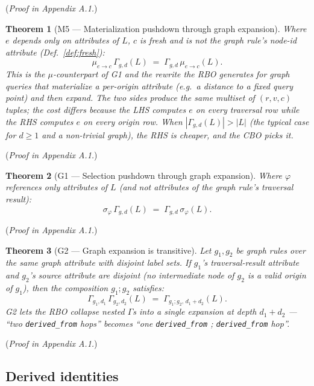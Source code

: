 \documentclass[acmsmall,review,anonymous]{acmart}
\theoremstyle{plain}
\newtheorem{theorem}{Theorem}
\theoremstyle{definition}
\theoremstyle{remark}
\begin{document}
(\textit{Proof in Appendix A.1.})

\begin{theorem}[M5 --- Materialization pushdown through graph expansion]\label{thm:m5}
Where $e$ depends only on attributes of $L$, $c$ is fresh and is
not the graph rule's node-id attribute (Def.~\ref{def:fresh}):
\[
\mu_{e \to c}\, \Gamma_{g, d}(L)
\;=\;
\Gamma_{g, d}\, \mu_{e \to c}(L).
\]
This is the $\mu$-counterpart of G1 and the rewrite the RBO
generates for graph queries that materialize a per-origin
attribute (e.g.\ a distance to a fixed query point) and then
expand. The two sides produce the same multiset of
$(r, v, c)$ tuples; the cost differs because the LHS computes
$e$ on every traversal row while the RHS computes $e$ on every
origin row. When $|\Gamma_{g,d}(L)| > |L|$ (the typical case for
$d \geq 1$ and a non-trivial graph), the RHS is cheaper, and
the CBO picks it.
\end{theorem}

(\textit{Proof in Appendix A.1.})

\begin{theorem}[G1 --- Selection pushdown through graph expansion]\label{thm:g1}
Where $\varphi$ references only attributes of $L$ (and not
attributes of the graph rule's traversal result):
\[
\sigma_\varphi\, \Gamma_{g, d}(L) \;=\; \Gamma_{g, d}\, \sigma_\varphi(L).
\]
\end{theorem}

(\textit{Proof in Appendix A.1.})

\begin{theorem}[G2 --- Graph expansion is transitive]\label{thm:g2}
Let $g_1, g_2$ be graph rules over the same graph attribute
with disjoint label sets. If $g_1$'s traversal-result
attribute and $g_2$'s source attribute are disjoint (no
intermediate node of $g_2$ is a valid origin of $g_1$),
then the composition $g_1 ; g_2$ satisfies:
\[
\Gamma_{g_1, d_1}\, \Gamma_{g_2, d_2}(L) \;=\;
\Gamma_{g_1;g_2,\, d_1+d_2}(L).
\]
G2 lets the RBO collapse nested $\Gamma$s into a single
expansion at depth $d_1 + d_2$ --- ``two \texttt{derived\_from}
hops'' becomes ``one \texttt{derived\_from} ;
\texttt{derived\_from} hop''.
\end{theorem}

(\textit{Proof in Appendix A.1.})

\subsection{Derived identities}\label{sec:equational:derived}
\end{document}
